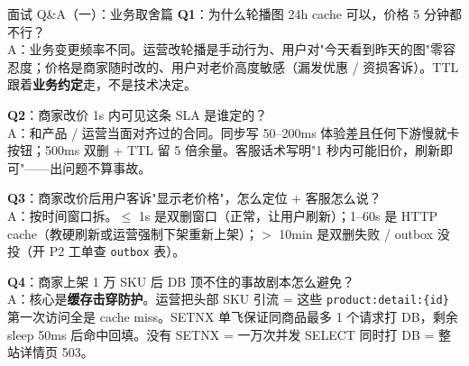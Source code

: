 \documentclass[aspectratio=169,11pt]{beamer}
\begin{document}
\begin{frame}[shrink]{面试 Q\&A（一）：业务取舍篇}
\small
\textbf{Q1}：为什么轮播图 24h cache 可以，价格 5 分钟都不行？\\
A：业务变更频率不同。运营改轮播是手动行为、用户对"今天看到昨天的图"零容忍度；价格是商家随时改的、用户对老价高度敏感（漏发优惠 / 资损客诉）。TTL 跟着\textbf{业务约定}走，不是技术决定。

\vspace{1mm}
\textbf{Q2}：商家改价 1s 内可见这条 SLA 是谁定的？\\
A：和产品 / 运营当面对齐过的合同。同步写 50--200ms 体验差且任何下游慢就卡按钮；500ms 双删 + TTL 留 5 倍余量。客服话术写明"1 秒内可能旧价，刷新即可"——出问题不算事故。

\vspace{1mm}
\textbf{Q3}：商家改价后用户客诉"显示老价格"，怎么定位 + 客服怎么说？\\
A：按时间窗口拆。$\le$ 1s 是双删窗口（正常，让用户刷新）；1--60s 是 HTTP cache（教硬刷新或运营强制下架重新上架）；$>$ 10min 是双删失败 / outbox 没投（开 P2 工单查 \texttt{outbox} 表）。

\vspace{1mm}
\textbf{Q4}：商家上架 1 万 SKU 后 DB 顶不住的事故剧本怎么避免？\\
A：核心是\textbf{缓存击穿防护}。运营把头部 SKU 引流 = 这些 \texttt{product:detail:\{id\}} 第一次访问全是 cache miss。SETNX 单飞保证同商品最多 1 个请求打 DB，剩余 sleep 50ms 后命中回填。没有 SETNX = 一万次并发 SELECT 同时打 DB = 整站详情页 503。
\end{frame}
\end{document}
